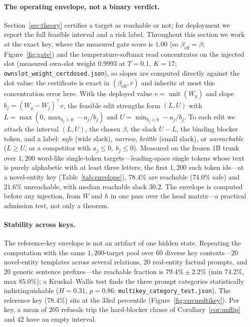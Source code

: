 \documentclass[10pt,twocolumn]{article}
\theoremstyle{remark}
\DeclareMathOperator{\unit}{unit}
\begin{document}
\paragraph{The operating envelope, not a binary verdict.}
Section~\ref{sec:theory} certifies a target as reachable or not; for deployment we
report the full feasible interval and a risk label. Throughout this section we
work at the exact key, where the measured gate score is $1.00$ (so
$\beta_{\mathrm{eff}}=\beta$; Figure~\ref{fig:gate}) and the temperature-softmax
read concentrates on the injected slot (measured own-slot weight $0.9993$ at
$T=0.1$, $K=17$; \texttt{ownslot\_weight\_certdosed.json}), so
slopes are computed directly against the slot value: the certificate is exact in
$(\beta_{\mathrm{eff}},\bar r)$ and inherits at most this concentration error
here. With the deployed value
$v=\unit(W_y)$ and slope $b_j=(W_y-W_j)^{\top}v$, the feasible edit strengths form
$(L,U)$ with $L=\max(0,\max_{b_j>0}-a_j/b_j)$ and $U=\min_{b_j<0}-a_j/b_j$. To each
edit we attach the interval $(L,U)$, the chosen $\beta$, the slack $U-L$, the
binding blocker token, and a label: \emph{safe} (wide slack), \emph{narrow},
\emph{brittle} (small slack), or \emph{unreachable} ($L\ge U$, or a competitor with
$a_j\le0,\ b_j\le0$). Measured on the frozen $1$B trunk over $1{,}200$ word-like
single-token targets---leading-space single tokens whose text is purely
alphabetic with at least three letters; the first $1{,}200$ such token ids---at
a novel-entity key (Table~\ref{tab:envelope}), $78.4\%$ are
reachable ($74.0\%$ safe) and $21.6\%$ unreachable, with median reachable slack
$30.2$. The envelope is computed before any injection, from $W$ and $h$ in one
pass over the head matrix---a practical admission test, not only a theorem.

\paragraph{Stability across keys.}
The reference-key envelope is not an artifact of one hidden state. Repeating the
computation with the same $1{,}200$-target pool over $60$ diverse key
contexts---$20$ novel-entity templates across several relations, $20$ real-entity
factual prompts, and $20$ generic sentence prefixes---the reachable fraction is
$79.4\%\pm2.2\%$ (min $74.2\%$, max $85.0\%$); a Kruskal--Wallis test finds the
three prompt categories statistically indistinguishable ($H=0.31$, $p=0.86$;
\texttt{multikey\_\allowbreak category\_\allowbreak test.json}). The reference
key ($78.4\%$) sits at the $33$rd percentile (Figure~\ref{fig:envmultikey}). Per key, a mean of $205$
refusals trip the hard-blocker clause of Corollary~\ref{cor:unflip} and $42$ have
an empty interval.
\end{document}
